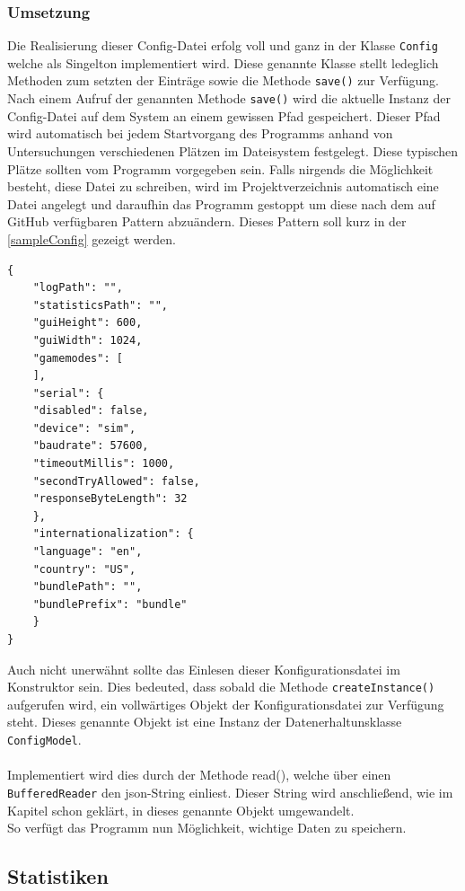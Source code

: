 \subsubsection{Umsetzung}
Die Realisierung dieser Config-Datei erfolg voll und ganz in der Klasse \lstinline[style=java]{Config} welche als Singelton implementiert wird.
Diese genannte Klasse stellt ledeglich Methoden zum setzten der Einträge sowie die Methode \lstinline[style=java]{save()} zur Verfügung.
Nach einem Aufruf der genannten Methode \lstinline[style=java]{save()} wird die aktuelle Instanz der Config-Datei auf dem System an einem gewissen Pfad gespeichert.
Dieser Pfad wird automatisch bei jedem Startvorgang des Programms anhand von Untersuchungen verschiedenen Plätzen im Dateisystem festgelegt.
Diese typischen Plätze sollten vom Programm vorgegeben sein.
Falls nirgends die Möglichkeit besteht, diese Datei zu schreiben, wird im Projektverzeichnis automatisch eine Datei angelegt und daraufhin das Programm gestoppt um diese nach dem auf GitHub verfügbaren Pattern abzuändern.
Dieses Pattern soll kurz in der \autoref{sampleConfig} gezeigt werden.
\begin{lstlisting}[style=json, caption=JSON-Codebeispiel,label=sampleConfig]
{
    "logPath": "",
    "statisticsPath": "",
    "guiHeight": 600,
    "guiWidth": 1024,
    "gamemodes": [
    ],
    "serial": {
    "disabled": false,
    "device": "sim",
    "baudrate": 57600,
    "timeoutMillis": 1000,
    "secondTryAllowed": false,
    "responseByteLength": 32
    },
    "internationalization": {
    "language": "en",
    "country": "US",
    "bundlePath": "",
    "bundlePrefix": "bundle"
    }
}
\end{lstlisting}
Auch nicht unerwähnt sollte das Einlesen dieser Konfigurationsdatei im Konstruktor sein.
Dies bedeuted, dass sobald die Methode \lstinline[style=java]{createInstance()} aufgerufen wird, ein vollwärtiges Objekt der Konfigurationsdatei zur Verfügung steht.
Dieses genannte Objekt ist eine Instanz der Datenerhaltunsklasse \lstinline[style=java]{ConfigModel}.\\\\
Implementiert wird dies durch der Methode read(), welche über einen \lstinline[style=java]{BufferedReader} den json-String einliest.
Dieser String wird anschließend, wie im Kapitel  schon geklärt, in dieses genannte Objekt umgewandelt.\\
So verfügt das Programm nun Möglichkeit, wichtige Daten zu speichern.
\subsection{Statistiken}
